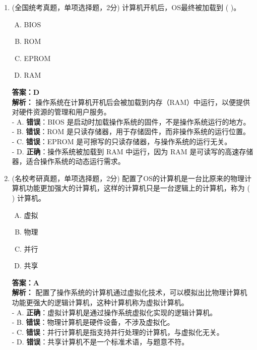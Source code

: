\documentclass[lang=cn,newtx,10pt,scheme=chinese]{../../elegantbook}
\begin{document}
\begin{enumerate}
\item (全国统考真题，单项选择题，2分) 计算机开机后，OS最终被加载到 (    )。
    \begin{enumerate}[A.]
        \item BIOS
        \item ROM
        \item EPROM
        \item RAM
    \end{enumerate}
    \textbf{答案：D}\\
    \textbf{解析：} 操作系统在计算机开机后会被加载到内存（RAM）中运行，以便提供对硬件资源的管理和用户服务。\\
    - A. \textbf{错误}：BIOS 是启动时加载操作系统的固件，不是操作系统运行的地方。\\
    - B. \textbf{错误}：ROM 是只读存储器，用于存储固件，而非操作系统的运行位置。\\
    - C. \textbf{错误}：EPROM 是可擦写的只读存储器，与操作系统的运行无关。\\
    - D. \textbf{正确}：操作系统被加载到 RAM 中运行，因为 RAM 是可读写的高速存储器，适合操作系统的动态运行需求。\\

    \item (名校考研真题，单项选择题，2分) 配置了OS的计算机是一台比原来的物理计算机功能更加强大的计算机，这样的计算机只是一台逻辑上的计算机，称为 (    ) 计算机。
    \begin{enumerate}[A.]
        \item 虚拟
        \item 物理
        \item 并行
        \item 共享
    \end{enumerate}
    \textbf{答案：A}\\
    \textbf{解析：} 配置了操作系统的计算机通过虚拟化技术，可以模拟出比物理计算机功能更强大的逻辑计算机，这种计算机称为虚拟计算机。\\
    - A. \textbf{正确}：虚拟计算机是通过操作系统虚拟化实现的逻辑计算机。\\
    - B. \textbf{错误}：物理计算机是硬件设备，不涉及虚拟化。\\
    - C. \textbf{错误}：并行计算机是指支持并行处理的计算机，与虚拟化无关。\\
    - D. \textbf{错误}：共享计算机不是一个标准术语，与题意不符。\\


\end{enumerate}
\end{document}
